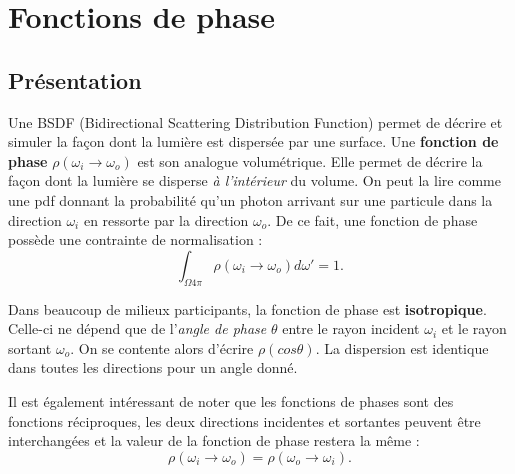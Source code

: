 \chapter{Fonctions de phase}

\section{Présentation}

Une BSDF (Bidirectional Scattering Distribution Function) permet de décrire et simuler la façon dont la lumière est dispersée par une surface. Une \textbf{fonction de phase} $\rho (\omega_{i}\longrightarrow\omega_{o})$ est son analogue volumétrique. Elle permet de décrire la façon dont la lumière se disperse \textit{à l'intérieur} du volume. On peut la lire comme une pdf donnant la probabilité qu'un photon arrivant sur une particule dans la direction $\omega_{i}$ en ressorte par la direction $\omega_{o}$. De ce fait, une fonction de phase possède une contrainte de normalisation :
\large \begin{equation}\label{eq:condition_de_normalisation}
    \int_{\Omega4\pi}\rho(\omega_{i}\longrightarrow\omega_{o})d\omega' = 1
.\end{equation} \normalsize \newline\par

Dans beaucoup de milieux participants, la fonction de phase est \textbf{isotropique}. Celle-ci ne dépend que de l'\textit{angle de phase} $\theta$ entre le rayon incident $\omega_{i}$ et le rayon sortant $\omega_{o}$. On se contente alors d'écrire $\rho(cos\theta)$. La dispersion est identique dans toutes les directions pour un angle donné.\par
Il est également intéressant de noter que les fonctions de phases sont des fonctions réciproques, les deux directions incidentes et sortantes peuvent être interchangées et la valeur de la fonction de phase restera la même :
\large \begin{equation}\label{eq:fp_reciprocité}
    \rho(\omega_{i}\longrightarrow\omega_{o}) = \rho(\omega_{o}\longrightarrow\omega_{i})
.\end{equation} \normalsize \newline\par


